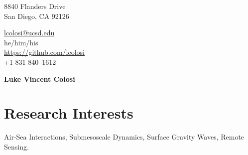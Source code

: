 \documentclass[10pt]{article}
\begin{document}
\pagestyle{empty}
\begin{minipage}[ht]{0.48\textwidth}
\begin{flushleft}
\small{8840 Flanders Drive} \\
\small{San Diego, CA 92126} \\
\end{flushleft}
\end{minipage}
\hfill
\begin{minipage}[ht]{0.48\textwidth}
\begin{flushright}
\noindent \href{mailto:lcolosi@ucsd.edu}{lcolosi@ucsd.edu} \ \ \ \ \ \ \ \ \ \ \ \ \ \ \ \ \ \ \ \   \\
\noindent he/him/his \ \ \ \ \ \ \ \ \ \ \ \ \ \ \ \ \ \ \ \ \ \ \ \ \ \ \  \\
{\url{https://github.com/lcolosi} }\\
\small{+1 831 840--1612} \ \ \ \ \ \ \ \ \ \ \ \ \ \ \ \ \  \ \ \ \ \ \ \     \\
\end{flushright}
\end{minipage}


\vspace{.5cm}
\begin{center}
	{\bfseries\Huge Luke Vincent Colosi}
\end{center}
\vspace{.5cm}

\section*{Research Interests}
\vspace{.3cm}
\hspace{1cm}Air-Sea Interactions, Submesoscale Dynamics, Surface Gravity Waves, Remote Sensing.

\end{document}
